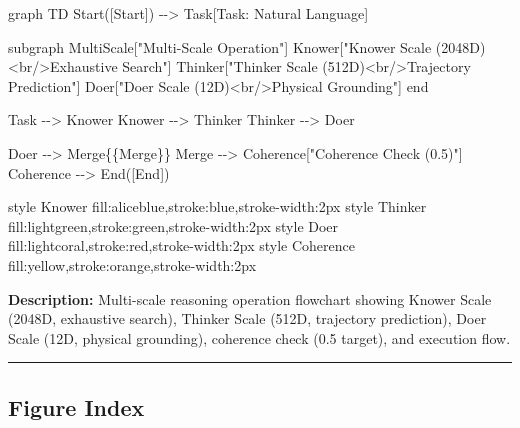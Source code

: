 \documentclass[
  letterpaper,
  DIV=11,
  numbers=noendperiod]{scrartcl}
\newenvironment{Shaded}{\begin{snugshade}}{\end{snugshade}}
\newcommand{\NormalTok}[1]{\textcolor[rgb]{0.00,0.23,0.31}{#1}}
\begin{document}
\begin{Shaded}
\begin{Highlighting}[]
\NormalTok{graph TD}
\NormalTok{    Start([Start]) {-}{-}\textgreater{} Task[Task: Natural Language]}
    
\NormalTok{    subgraph MultiScale["Multi{-}Scale Operation"]}
\NormalTok{        Knower["Knower Scale (2048D)\textless{}br/\textgreater{}Exhaustive Search"]}
\NormalTok{        Thinker["Thinker Scale (512D)\textless{}br/\textgreater{}Trajectory Prediction"]}
\NormalTok{        Doer["Doer Scale (12D)\textless{}br/\textgreater{}Physical Grounding"]}
\NormalTok{    end}
    
\NormalTok{    Task {-}{-}\textgreater{} Knower}
\NormalTok{    Knower {-}{-}\textgreater{} Thinker}
\NormalTok{    Thinker {-}{-}\textgreater{} Doer}
    
\NormalTok{    Doer {-}{-}\textgreater{} Merge\{\{Merge\}\}}
\NormalTok{    Merge {-}{-}\textgreater{} Coherence["Coherence Check (0.5)"]}
\NormalTok{    Coherence {-}{-}\textgreater{} End([End])}
    
\NormalTok{    style Knower fill:aliceblue,stroke:blue,stroke{-}width:2px}
\NormalTok{    style Thinker fill:lightgreen,stroke:green,stroke{-}width:2px}
\NormalTok{    style Doer fill:lightcoral,stroke:red,stroke{-}width:2px}
\NormalTok{    style Coherence fill:yellow,stroke:orange,stroke{-}width:2px}
\end{Highlighting}
\end{Shaded}

\textbf{Description:} Multi-scale reasoning operation flowchart showing
Knower Scale (2048D, exhaustive search), Thinker Scale (512D, trajectory
prediction), Doer Scale (12D, physical grounding), coherence check (0.5
target), and execution flow.

\begin{center}\rule{0.5\linewidth}{0.5pt}\end{center}

\subsection{Figure Index}\label{figure-index}
\end{document}
